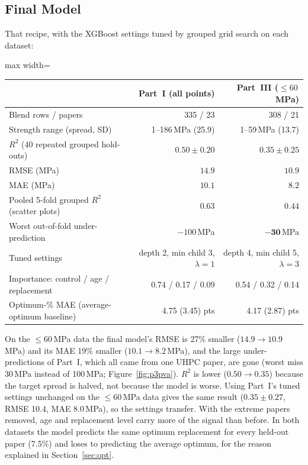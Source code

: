 \documentclass[11pt]{article}
\newcommand{\R}{$R^2$}
\begin{document}
\subsection{Final Model}
\label{sec:p3-final}
That recipe, with the XGBoost settings tuned by grouped grid search on each dataset:

\begin{center}\small
\begin{adjustbox}{max width=\linewidth}
\begin{tabular}{lrr}
\toprule
& Part~I (all points) & Part~III ($\leq60$\,MPa) \\
\midrule
Blend rows / papers & 335 / 23 & 308 / 21 \\
Strength range (spread, SD) & 1--186\,MPa (25.9) & 1--59\,MPa (13.7) \\
\midrule
\R{} (40 repeated grouped hold-outs) & $\mathbf{0.50\pm0.20}$ & $0.35\pm0.25$ \\
RMSE (MPa) & $14.9$ & $\mathbf{10.9}$ \\
MAE (MPa) & $10.1$ & $\mathbf{8.2}$ \\
Pooled 5-fold grouped \R{} (scatter plots) & $0.63$ & $0.44$ \\
Worst out-of-fold under-prediction & $-100$\,MPa & $\mathbf{-30}$\,MPa \\
\midrule
Tuned settings & depth 2, min child 3, $\lambda=1$ & depth 4, min child 5, $\lambda=3$ \\
Importance: control / age / replacement & 0.74 / 0.17 / 0.09 & 0.54 / 0.32 / 0.14 \\
Optimum-\% MAE (average-optimum baseline) & 4.75 (3.45) pts & 4.17 (2.87) pts \\
\bottomrule
\end{tabular}
\end{adjustbox}
\end{center}

\noindent On the $\leq60$\,MPa data the final model's RMSE is 27\% smaller
($14.9\to10.9$\,MPa) and its MAE 19\% smaller ($10.1\to8.2$\,MPa), and the large under-predictions of
Part~I, which all came from one UHPC paper, are gone (worst miss 30\,MPa instead of
100\,MPa; Figure~\ref{fig:p3pva}). \R{} is lower ($0.50\to0.35$) because the target spread
is halved, not because the model is worse. Using Part~I's tuned settings unchanged on the
$\leq60$\,MPa data gives the same result ($0.35\pm0.27$, RMSE 10.4, MAE 8.0\,MPa), so the
settings transfer. With the extreme papers removed, age and replacement level carry more
of the signal than before. In both datasets the model predicts the same optimum
replacement for every held-out paper (7.5\%) and loses to predicting the average optimum,
for the reason explained in Section~\ref{sec:opt}.
\end{document}
